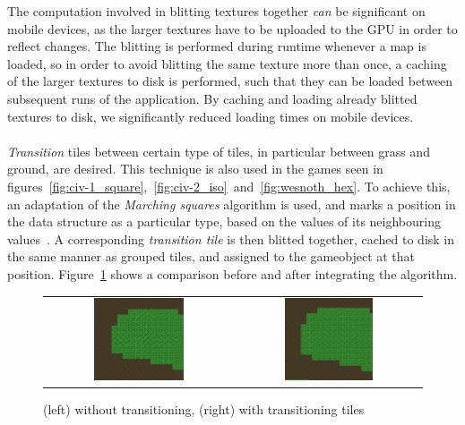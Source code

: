 The computation involved in blitting textures together \textit{can} be significant on mobile devices, as the larger textures have to be uploaded to the GPU in order to reflect changes.
The blitting is performed during runtime whenever a map is loaded, so in order to avoid blitting the same texture more than once, a caching of the larger textures to disk is performed, such that they can be loaded between subsequent runs of the application.
By caching and loading already blitted textures to disk, we significantly reduced loading times on mobile devices.
\\
\\
\textit{Transition} tiles between certain type of tiles, in particular between grass and ground, are desired.
This technique is also used in the games seen in figures~\ref{fig:civ-1_square},~\ref{fig:civ-2_iso}~and~\ref{fig:wesnoth_hex}.
To achieve this, an adaptation of the \textit{Marching squares} algorithm is used, and marks a position in the data structure as a particular type, based on the values of its neighbouring values~\cite{marching-squares}.
A corresponding \textit{transition tile} is then blitted together, cached to disk in the same manner as grouped tiles, and assigned to the gameobject at that position.
Figure~\ref{fig:transition_comparison} shows a comparison before and after integrating the algorithm.

\begin{figure}[H]
    \centering
    \begin{tabular}{cc}
        \includegraphics[width=0.5\textwidth]{figures/generating_levels/no_transition.png}
        &
        \includegraphics[width=0.5\textwidth]{figures/generating_levels/with_transition.png}
    \end{tabular}
    \caption{(left) without transitioning, (right) with transitioning tiles}\label{fig:transition_comparison}
\end{figure}

